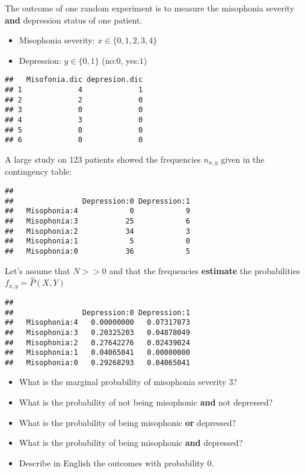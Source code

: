 \documentclass[
]{book}
\providecommand{\tightlist}{%
  \setlength{\itemsep}{0pt}\setlength{\parskip}{0pt}}
\begin{document}
The outcome of one random experiment is to measure the misophonia severity \textbf{and} depression status of one patient.

\begin{itemize}
\tightlist
\item
  Misophonia severity: \(x\in \{0,1,2,3,4\}\)
\item
  Depression: \(y\in \{0,1\}\) (no:\(0\), yes:\(1\))
\end{itemize}

\begin{verbatim}
##   Misofonia.dic depresion.dic
## 1             4             1
## 2             2             0
## 3             0             0
## 4             3             0
## 5             0             0
## 6             0             0
\end{verbatim}

A large study on 123 patients showed the frequencies \(n_{x,y}\) given in the contingency table:

\begin{verbatim}
##               
##                Depression:0 Depression:1
##   Misophonia:4            0            9
##   Misophonia:3           25            6
##   Misophonia:2           34            3
##   Misophonia:1            5            0
##   Misophonia:0           36            5
\end{verbatim}

Let's assume that \(N>>0\) and that the frequencies \textbf{estimate} the probabilities \(f_{x,y}=\hat{P}(X, Y)\)

\begin{verbatim}
##               
##                Depression:0 Depression:1
##   Misophonia:4   0.00000000   0.07317073
##   Misophonia:3   0.20325203   0.04878049
##   Misophonia:2   0.27642276   0.02439024
##   Misophonia:1   0.04065041   0.00000000
##   Misophonia:0   0.29268293   0.04065041
\end{verbatim}

\begin{itemize}
\tightlist
\item
  What is the marginal probability of misophonia severity 3?
\item
  What is the probability of not being misophonic \textbf{and} not depressed?
\item
  What is the probability of being misophonic \textbf{or} depressed?
\item
  What is the probability of being misophonic \textbf{and} depressed?
\item
  Describe in English the outcomes with probability 0.
\end{itemize}
\end{document}
